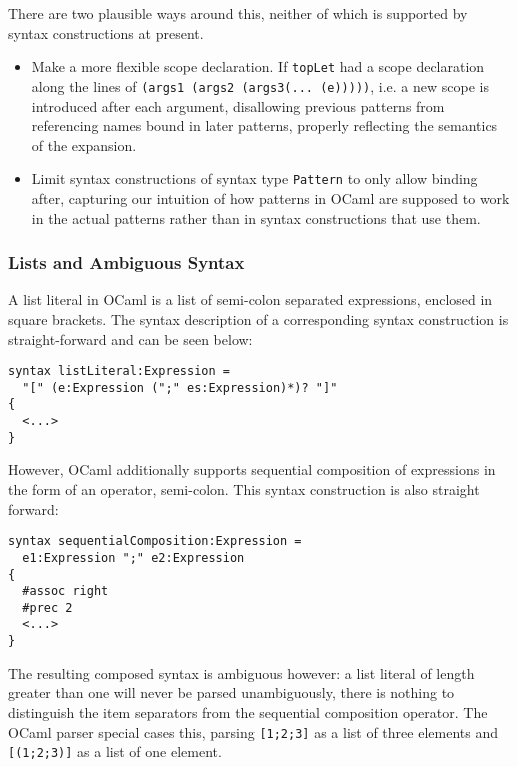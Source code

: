 \documentclass{kththesis}
\begin{document}
There are two plausible ways around this, neither of which is supported by syntax constructions at present.
\begin{itemize}
  \item Make a more flexible scope declaration. If \texttt{topLet} had a scope declaration along the lines of \texttt{(args1 (args2 (args3(... (e)))))}, i.e. a new scope is introduced after each argument, disallowing previous patterns from referencing names bound in later patterns, properly reflecting the semantics of the expansion.

  \item Limit syntax constructions of syntax type \texttt{Pattern} to only allow binding after, capturing our intuition of how patterns in OCaml are supposed to work in the actual patterns rather than in syntax constructions that use them.
\end{itemize}

\subsubsection{Lists and Ambiguous Syntax} \label{sec:ambiguous-lists}

A list literal in OCaml is a list of semi-colon separated expressions, enclosed in square brackets. The syntax description of a corresponding syntax construction is straight-forward and can be seen below:

\begin{verbatim}
syntax listLiteral:Expression =
  "[" (e:Expression (";" es:Expression)*)? "]"
{
  <...>
}
\end{verbatim}

However, OCaml additionally supports sequential composition of expressions in the form of an operator, semi-colon. This syntax construction is also straight forward:

\begin{verbatim}
syntax sequentialComposition:Expression =
  e1:Expression ";" e2:Expression
{
  #assoc right
  #prec 2
  <...>
}
\end{verbatim}

The resulting composed syntax is ambiguous however: a list literal of length greater than one will never be parsed unambiguously, there is nothing to distinguish the item separators from the sequential composition operator. The OCaml parser special cases this, parsing \texttt{[1;2;3]} as a list of three elements and \texttt{[(1;2;3)]} as a list of one element.
\end{document}
